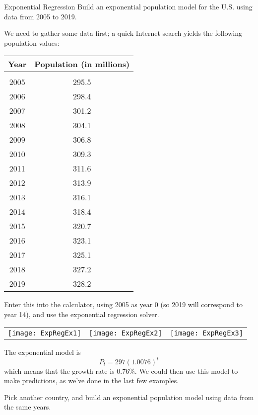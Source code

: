 \begin{example}{Exponential Regression}
Build an exponential population model for the U.S. using data from 2005 to 2019.

\sol
We need to gather some data first; a quick Internet search yields the following population values:
\begin{center}
\begin{tabular}{c c}
\textbf{Year} & \textbf{Population (in millions)}\\
\hline
& \\
2005 & 295.5\\
2006 & 298.4\\
2007 & 301.2\\
2008 & 304.1\\
2009 & 306.8\\
2010 & 309.3\\
2011 & 311.6\\
2012 & 313.9\\
2013 & 316.1\\
2014 & 318.4\\
2015 & 320.7\\
2016 & 323.1\\
2017 & 325.1\\
2018 & 327.2\\
2019 & 328.2
\end{tabular}
\end{center}

Enter this into the calculator, using 2005 as year 0 (so 2019 will correspond to year 14), and use the exponential regression solver.
\begin{center}
\begin{tabular}{c c c}
\texttt{[image: ExpRegEx1]}
& \texttt{[image: ExpRegEx2]}
& \texttt{[image: ExpRegEx3]}
\end{tabular}
\end{center}

The exponential model is \[\boxed{P_t = 297(1.0076)^t}\] which means that the growth rate is 0.76\%.  We could then use this model to make predictions, as we've done in the last few examples.
\end{example}

\begin{try}
Pick another country, and build an exponential population model using data from the same years.
\end{try}
\pagebreak

